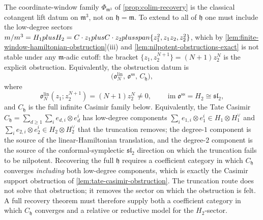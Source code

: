 \begin{thm}
\label{rmk:colim-does-not-recover-full}
The coordinate-window family
  $\Phi_{\mathfrak m^3}$ of \ref{prop:colim-recovery} is the
  classical cotangent lift datum on $\mathfrak m^3$, not on
$\mathfrak h=\mathfrak m$. To extend to all of $\mathfrak h$ one must
include the low-degree sectors
$m/m^3=H_1plus H_2=C\cdot z_1plus
C\cdot z_2plusspan\{z_1^2,z_1z_2,z_2^2\}$, which by
\ref{lem:finite-window-hamiltonian-obstruction}(iii) and
\ref{lem:nilpotent-obstructions-exact} is not stable
under any $\mathfrak m$-adic cutoff: the bracket
$\{z_1,z_2^{N+1}\}=(N+1)z_2^N$ is the explicit obstruction.
Equivalently, the obstruction datum is
\[
  \bigl(\mathfrak o^{\mathrm{lin}}_N,\,
    \mathfrak o^{\mathrm{ss}},\,
    C_{\mathfrak h}\bigr),
\]
where
\[
  \mathfrak o^{\mathrm{lin}}_N(z_1;z_2^{N+1})
    =(N+1)z_2^N\neq0,\qquad
  \operatorname{im}\mathfrak o^{\mathrm{ss}}=H_2\cong\mathfrak{sl}_2,
\]
and \(C_{\mathfrak h}\) is the full infinite Casimir family below.
Equivalently, the Tate Casimir
$C_{\mathfrak h}=\sum_{d\geq 1}\sum_i e_{d,i}\otimes e_d^i$ has
low-degree components
$\sum_i e_{1,i}\otimes e_1^i\in H_1\otimes H_1^\vee$ and
$\sum_i e_{2,i}\otimes e_2^i\in H_2\otimes H_2^\vee$
that the truncation removes; the degree-$1$ component is the source
of the linear-Hamiltonian translation, and the degree-$2$ component
is the source of the conformal-symplectic $\mathfrak{sl}_2$ direction
on which the truncation fails to be nilpotent. Recovering the full
$\mathfrak h$ requires a coefficient category in which
$C_{\mathfrak h}$ converges \emph{including} both low-degree
components, which is exactly the Casimir support obstruction of
\ref{lem:tate-casimir-obstruction}. The truncation route does not
solve that obstruction; it removes the sector on which the
obstruction is felt.  A full recovery theorem must therefore supply
both a coefficient category in which \(C_{\mathfrak h}\) converges and a
relative or reductive model for the \(H_2\)-sector.
\end{thm}

